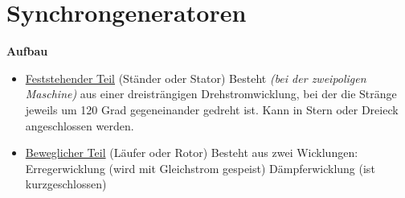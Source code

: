 \section{Synchrongeneratoren}


\textbf{Aufbau}

\begin{itemize}
    \item \underline{Feststehender Teil} (Ständer oder Stator)
    \newline Besteht \textit{(bei der zweipoligen Maschine)} aus einer dreisträngigen Drehstromwicklung, bei der die Stränge jeweils um 120 Grad gegeneinander gedreht ist. Kann in Stern oder Dreieck angeschlossen werden.
    \item \underline{Beweglicher Teil} (Läufer oder Rotor)
    \newline Besteht aus zwei Wicklungen:
    \subitem Erregerwicklung (wird mit Gleichstrom gespeist)
    \subitem Dämpferwicklung (ist kurzgeschlossen)
\end{itemize}